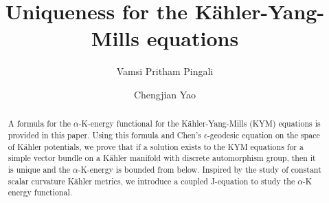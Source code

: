 \documentclass[10pt, letterpaper]{amsart}
\title[Uniqueness for the K\"ahler Yang-Mills equations]{Uniqueness for the K\"ahler-Yang-Mills equations}
\author[V. P. Pingali]{Vamsi Pritham Pingali}
\author[C.-J. Yao]{Chengjian Yao}
\theoremstyle{plain}
\theoremstyle{definition}
\numberwithin{equation}{section}
\begin{document}
\begin{abstract}
A formula for the $\alpha$-K-energy functional for the K\"ahler-Yang-Mills (KYM) equations is provided in this paper. Using this formula and Chen's $\epsilon$-geodesic equation on the space of K\"ahler potentials, we prove that if a solution exists to the KYM equations for a simple vector bundle on a K\"ahler manifold with discrete automorphism group, then it is unique and the $\alpha$-K-energy is bounded from below. Inspired by the study of constant scalar curvature K\"ahler metrics, we  introduce a coupled J-equation to study the $\alpha$-K energy functional.
\end{abstract}
\maketitle
\end{document}
